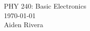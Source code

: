 \documentclass[12pt]{article}
\theoremstyle{definition}
\newtheorem{defn}{Definition}
\newtheorem{note}{Note}
\begin{document}
\setcounter{section}{0}

\begingroup
\centering
\LARGE PHY 240: Basic Electronics\\[0.5em]
\large \today\\[0.5em]
\large Aiden Rivera\par
\endgroup

%
%
%
%
\end{document}
